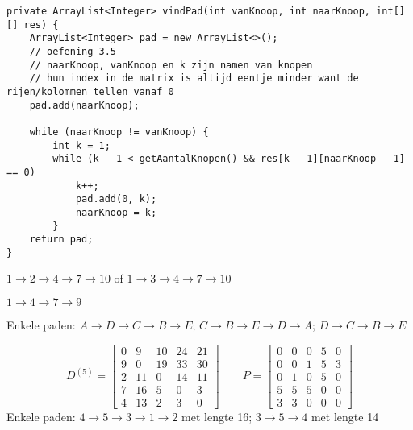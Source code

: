 \begin{Oplossing}{9.5}
\begin{lstlisting}[caption=vindPad, label=DijkstravindPad]
private ArrayList<Integer> vindPad(int vanKnoop, int naarKnoop, int[][] res) {
    ArrayList<Integer> pad = new ArrayList<>();
    // oefening 3.5
    // naarKnoop, vanKnoop en k zijn namen van knopen
    // hun index in de matrix is altijd eentje minder want de rijen/kolommen tellen vanaf 0
    pad.add(naarKnoop);

    while (naarKnoop != vanKnoop) {
        int k = 1;
        while (k - 1 < getAantalKnopen() && res[k - 1][naarKnoop - 1] == 0)
            k++;
            pad.add(0, k);
            naarKnoop = k;
        }
    return pad;
}
\end{lstlisting}
\end{Oplossing}
\begin{Oplossing}{10.1}
$1\rightarrow2\rightarrow4\rightarrow7\rightarrow10$
of
$1\rightarrow3\rightarrow4\rightarrow7\rightarrow10$
\end{Oplossing}
\begin{Oplossing}{10.2}
$1\rightarrow4\rightarrow7\rightarrow9$
\end{Oplossing}
\begin{Oplossing}{10.3}
Enkele paden: $A\rightarrow D\rightarrow C\rightarrow B\rightarrow E$;  $C\rightarrow B\rightarrow E\rightarrow D\rightarrow A$; $D\rightarrow C\rightarrow B\rightarrow E$
\end{Oplossing}
\begin{Oplossing}{10.4}
\begin{equation*}
D^{(5)}=\begin{bmatrix}
0 & 9 & 10 & 24 & 21\\
9 & 0 & 19 & 33 & 30\\
2 & 11 & 0 & 14 & 11\\
7 & 16 & 5 & 0 & 3\\
4 & 13 & 2 & 3 &0
\end{bmatrix}
\qquad
P=\begin{bmatrix}
0 & 0 & 0 & 5 & 0\\
0 & 0 & 1 & 5 & 3\\
0 & 1 & 0 & 5 & 0\\
5 & 5 & 5 & 0 & 0\\
3 & 3 & 0 & 0 & 0
\end{bmatrix}
\end{equation*}
Enkele paden: $4 \rightarrow5\rightarrow3\rightarrow1\rightarrow2$ met lengte 16; $3\rightarrow5\rightarrow4$ met lengte 14
\end{Oplossing}
